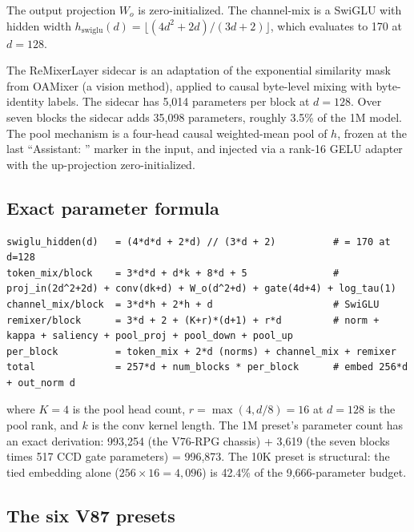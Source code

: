 \documentclass[11pt]{article}
\begin{document}
The output projection $W_o$ is zero-initialized. The channel-mix is a SwiGLU with hidden width $h_{\text{swiglu}}(d) = \lfloor (4d^2 + 2d) / (3d + 2) \rfloor$, which evaluates to 170 at $d=128$.

The ReMixerLayer sidecar is an adaptation of the exponential similarity mask from OAMixer (a vision method), applied to causal byte-level mixing with byte-identity labels. The sidecar has 5,014 parameters per block at $d = 128$. Over seven blocks the sidecar adds 35,098 parameters, roughly 3.5\% of the 1M model. The pool mechanism is a four-head causal weighted-mean pool of $h$, frozen at the last ``Assistant: '' marker in the input, and injected via a rank-16 GELU adapter with the up-projection zero-initialized.

\subsection{Exact parameter formula}

\begin{lstlisting}
swiglu_hidden(d)   = (4*d*d + 2*d) // (3*d + 2)          # = 170 at d=128
token_mix/block    = 3*d*d + d*k + 8*d + 5               # proj_in(2d^2+2d) + conv(dk+d) + W_o(d^2+d) + gate(4d+4) + log_tau(1)
channel_mix/block  = 3*d*h + 2*h + d                     # SwiGLU
remixer/block      = 3*d + 2 + (K+r)*(d+1) + r*d         # norm + kappa + saliency + pool_proj + pool_down + pool_up
per_block          = token_mix + 2*d (norms) + channel_mix + remixer
total              = 257*d + num_blocks * per_block      # embed 256*d + out_norm d
\end{lstlisting}

where $K=4$ is the pool head count, $r = \max(4, d/8) = 16$ at $d=128$ is the pool rank, and $k$ is the conv kernel length. The 1M preset's parameter count has an exact derivation: 993,254 (the V76-RPG chassis) + 3,619 (the seven blocks times 517 CCD gate parameters) = 996,873. The 10K preset is structural: the tied embedding alone ($256 \times 16 = 4{,}096$) is 42.4\% of the 9,666-parameter budget.

\subsection{The six V87 presets}
\end{document}
